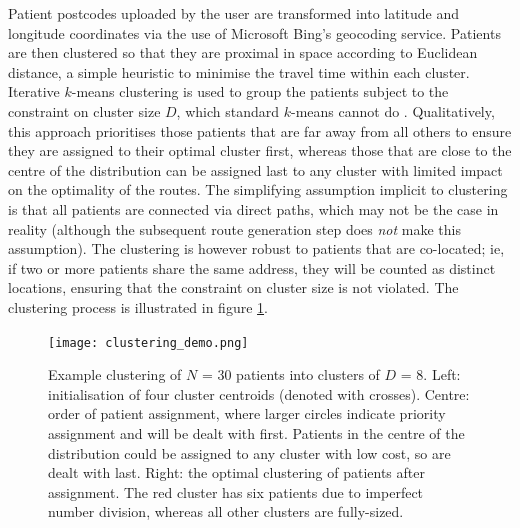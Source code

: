 \documentclass{article}
\begin{document}
Patient postcodes uploaded by the user are transformed into latitude and longitude coordinates via the use of Microsoft Bing's geocoding service. Patients are then clustered so that they are proximal in space according to Euclidean distance, a simple heuristic to minimise the travel time within each cluster. Iterative $k$-means clustering is used to group the patients subject to the constraint on cluster size $D$, which standard $k$-means cannot do \cite{macqueen1967some, davidson2005clustering}. Qualitatively, this approach prioritises those patients that are far away from all others to ensure they are assigned to their optimal cluster first, whereas those that are close to the centre of the distribution can be assigned last to any cluster with limited impact on the optimality of the routes. The simplifying assumption implicit to clustering is that all patients are connected via direct paths, which may not be the case in reality (although the subsequent route generation step does \textit{not} make this assumption). The clustering is however robust to patients that are co-located; ie, if two or more patients share the same address, they will be counted as distinct locations, ensuring that the constraint on cluster size is not violated. The clustering process is illustrated in figure \ref{clustering}. 

\begin{figure}[H]
\centering
\texttt{[image: clustering\_demo.png]}
\caption{Example clustering of $N$ = 30 patients into clusters of $D$ = 8. Left: initialisation of four cluster centroids (denoted with crosses). Centre: order of patient assignment, where larger circles indicate priority assignment and will be dealt with first. Patients in the centre of the distribution could be assigned to any cluster with low cost, so are dealt with last. Right: the optimal clustering of patients after assignment. The red cluster has six patients due to imperfect number division, whereas all other clusters are fully-sized.}
\label{clustering}
\end{figure}
\end{document}
